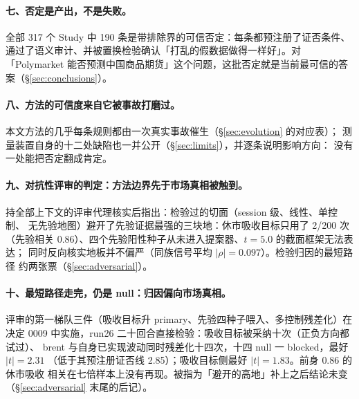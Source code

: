 \documentclass[11pt]{ctexart}
\begin{document}
\paragraph{七、否定是产出，不是失败。}
全部 317 个 Study 中 190 条是带排除界的可信否定：每条都预注册了证否条件、
通过了语义审计、并被置换检验确认「打乱的假数据做得一样好」。对「Polymarket
能否预测中国商品期货」这个问题，这批否定就是当前最可信的答案（\S\ref{sec:conclusions}）。

\paragraph{八、方法的可信度来自它被事故打磨过。}
本文方法的几乎每条规则都由一次真实事故催生（\S\ref{sec:evolution} 的对应表）；
测量装置自身的十二处缺陷也一并公开（\S\ref{sec:limits}），并逐条说明影响方向：
没有一处能把否定翻成肯定。

\paragraph{九、对抗性评审的判定：方法边界先于市场真相被触到。}
持全部上下文的评审代理核实后指出：检验过的切面（session 级、线性、单控制、
无先验地图）避开了先验证据最强的三块地：休市吸收目标只用了 2/200 次
（先验相关 0.86）、四个先验阳性种子从未进入提案器、$t=5.0$ 的截面框架无法表达；
同时反向核实地板并不偏严（同族信号平均 $|\rho|=0.097$）。检验归因的最短路径
约两张票（\S\ref{sec:adversarial}）。

\paragraph{十、最短路径走完，仍是 null：归因偏向市场真相。}
评审的第一梯队三件（吸收目标升 primary、先验四种子喂入、多控制残差化）在
决定 0009 中实施，run26 二十回合直接检验：吸收目标被采纳十次（正负方向都试过）、
brent 与自身已实现波动同时残差化十四次，十四 null 一 blocked，最好 $|t|=2.31$
（低于其预注册证否线 2.85）；吸收目标侧最好 $|t|=1.83$。前身 $0.86$ 的休市吸收
相关在七倍样本上没有再现。被指为「避开的高地」补上之后结论未变
（\S\ref{sec:adversarial} 末尾的后记）。
\end{document}
